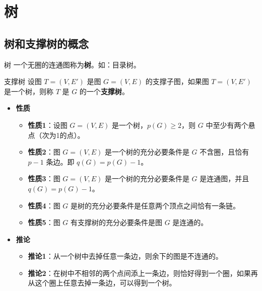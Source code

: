 	\section{树}
	\subsection{树和支撑树的概念}
	\begin{dfnbox}{树}{}
		一个无圈的连通图称为\textbf{树}。如：目录树。
		\end{dfnbox}
	\begin{dfnbox}{支撑树}{}
		设图 \( T = (V, E') \) 是图 \( G = (V, E) \) 的支撑子图，如果图 \( T = (V, E') \) 是一个树，则称 \( T \) 是 \( G \) 的一个\textbf{支撑树}。
	\end{dfnbox}
	\begin{itemize}
		\item \textbf{性质}
		\begin{itemize}
			\item \textbf{性质1}：设图 \( G=(V,E) \) 是一个树，\( p(G) \geq 2 \)，则 \( G \) 中至少有两个悬点（次为1的点）。
			\item \textbf{性质2}：图 \( G=(V,E) \) 是一个树的充分必要条件是 \( G \) 不含圈，且恰有 \( p-1 \) 条边。即 \( q(G)=p(G)-1 \)。
			\item \textbf{性质3}：图 \( G=(V,E) \) 是一个树的充分必要条件是 \( G \) 是连通图，并且 \( q(G)=p(G)-1 \)。
			\item \textbf{性质4}：图 \( G \) 是树的充分必要条件是任意两个顶点之间恰有一条链。
			\item \textbf{性质5}：图 \( G \) 有支撑树的充分必要条件是图 \( G \) 是连通的。
		\end{itemize}
		\item \textbf{推论}
		\begin{itemize}
			\item \textbf{推论1}：从一个树中去掉任意一条边，则余下的图是不连通的。
			\item \textbf{推论2}：在树中不相邻的两个点间添上一条边，则恰好得到一个圈，如果再从这个圈上任意去掉一条边，可以得到一个树。
		\end{itemize}
	\end{itemize}
	

